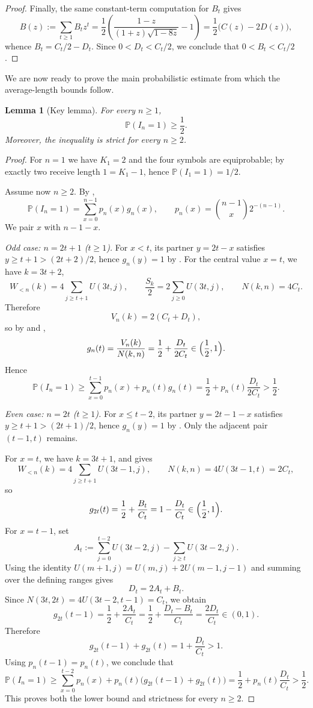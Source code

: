 \documentclass[10pt,a4paper]{article}
\newtheorem{lemma}{Lemma}
\theoremstyle{definition}
\theoremstyle{remark}
\newcommand{\1}{\mathbf{1}}
\newcommand{\PP}{\mathbb{P}}
\begin{document}
\begin{proof}
Finally, the same constant-term computation for $B_t$ gives
\[
B(z):=\sum_{t\ge1}B_tz^t
=
\frac12\left(\frac{1-z}{(1+z)\sqrt{1-8z}}-1\right)
=
\frac12\bigl(C(z)-2D(z)\bigr),
\]
whence $B_t=C_t/2-D_t$. Since $0<D_t<C_t/2$, we conclude that $0<B_t<C_t/2$.
\end{proof}

We are now ready to prove the main probabilistic estimate from which the average-length bounds follow.

\begin{lemma}[Key lemma]\label{lem:key}
For every $n\ge1$,
\[
\PP(I_n=1)\ge \frac12.
\]
Moreover, the inequality is strict for every $n\ge2$.
\end{lemma}

\begin{proof}
For $n=1$ we have $K_1=2$ and the four symbols are equiprobable; by  exactly two receive length $1=K_1-1$, hence $\PP(I_1=1)=1/2$.

Assume now $n\ge2$. By ,
\[
\PP(I_n=1)=\sum_{x=0}^{n-1}p_n(x)g_n(x),
\qquad
p_n(x)=\binom{n-1}{x}2^{-(n-1)}.
\]
We pair $x$ with $n-1-x$.

\smallskip
\noindent\emph{Odd case: $n=2t+1$ ($t\ge1$).}
For $x<t$, its partner $y=2t-x$ satisfies $y\ge t+1>(2t+2)/2$, hence $g_n(y)=1$ by . For the central value $x=t$, we have $k=3t+2$,
\[
W_{<n}(k)=4\sum_{j\ge t+1}U(3t,j),
\qquad
\frac{S_k}{2}=2\sum_{j\ge0}U(3t,j),
\qquad
N(k,n)=4C_t.
\]
Therefore
\[
V_n(k)=2\left(C_t+D_t\right),
\]
so by  and ,
\[
g_n(t)=\frac{V_n(k)}{N(k,n)}=\frac12+\frac{D_t}{2C_t}\in\Bigl(\frac12,1\Bigr).
\]
Hence
\[
\PP(I_n=1)
\ge \sum_{x=0}^{t-1}p_n(x)+p_n(t)g_n(t)
=\frac12+p_n(t)\frac{D_t}{2C_t}
>\frac12.
\]

\smallskip
\noindent\emph{Even case: $n=2t$ ($t\ge1$).}
For $x\le t-2$, its partner $y=2t-1-x$ satisfies $y\ge t+1>(2t+1)/2$, hence $g_n(y)=1$ by . Only the adjacent pair $(t-1,t)$ remains.

For $x=t$, we have $k=3t+1$, and  gives
\[
W_{<n}(k)=4\sum_{j\ge t+1}U(3t-1,j),
\qquad
N(k,n)=4U(3t-1,t)=2C_t,
\]
so
\[
g_{2t}(t)=\frac12+\frac{B_t}{C_t}=1-\frac{D_t}{C_t}\in\Bigl(\frac12,1\Bigr).
\]
For $x=t-1$, set
\[
A_t:=\sum_{j=0}^{t-2}U(3t-2,j)-\sum_{j\ge t}U(3t-2,j).
\]
Using the identity $U(m+1,j)=U(m,j)+2U(m-1,j-1)$ and summing over the defining ranges gives
\[
D_t=2A_t+B_t.
\]
Since $N(3t,2t)=4U(3t-2,t-1)=C_t$, we obtain
\[
g_{2t}(t-1)=\frac12+\frac{2A_t}{C_t}
=\frac12+\frac{D_t-B_t}{C_t}
=\frac{2D_t}{C_t}\in(0,1).
\]
Therefore
\[
g_{2t}(t-1)+g_{2t}(t)=1+\frac{D_t}{C_t}>1.
\]
Using $p_n(t-1)=p_n(t)$, we conclude that
\[
\PP(I_n=1)
\ge \sum_{x=0}^{t-2}p_n(x)+p_n(t)\bigl(g_{2t}(t-1)+g_{2t}(t)\bigr)
=\frac12+p_n(t)\frac{D_t}{C_t}
>\frac12.
\]
This proves both the lower bound and strictness for every $n\ge2$.
\end{proof}
\end{document}
